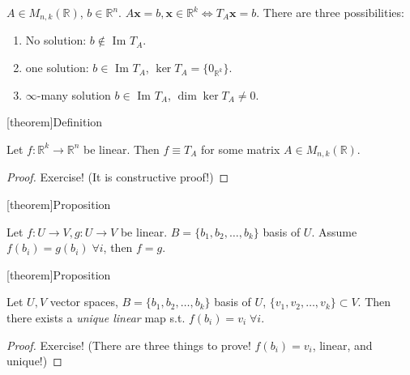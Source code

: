 \documentclass[12pt]{report}
\theoremstyle{definition}
\begin{document}
\begin{ex}
    $A \in M_{n,k}(\mathbb{R})$, $b \in \mathbb{R}^{n}$.
    $A\mathbf{x} = b, \mathbf{x} \in \mathbb{R}^{k} \iff T_A \mathbf{x} = b$.
    There are three possibilities:
    \begin{enumerate}[label = (\arabic*)]
        \item No solution: $b \notin $ Im $T_A$.
        \item one solution: $b \in$ Im $T_A$, $\ker{T_A} = \{0_{\mathbb{R}^{k}}\}$.
        \item $\infty$-many solution $b \in$ Im $T_A$, $\dim{\ker{T_A}} \neq 0$.
    \end{enumerate}
\end{ex}

[theorem]{Definition}
\begin{linear map has a matrix representation}
    Let $f:\mathbb{R}^{k} \rightarrow{} \mathbb{R}^{n}$ be linear.
    Then $f \equiv T_A$ for some matrix $A \in M_{n,k}(\mathbb{R})$.
\end{linear map has a matrix representation}

\begin{proof}
   Exercise! (It is constructive proof!)
\end{proof}

[theorem]{Proposition}
\begin{same basis tranformed implies same linear map}
    Let $f:U\rightarrow{}V, g:U\rightarrow{}V$ be linear.
    $B = \{b_1, b_2,\ldots,b_k\}$ basis of $U$.
    Assume $f(b_i) = g(b_i) \;\forall i$, then $f = g$.
\end{same basis tranformed implies same linear map}

[theorem]{Proposition}
\begin{unique linear map from U to V}
    Let $U,V$ vector spaces, $B = \{b_1, b_2,\ldots,b_k\}$ basis of $U$,
    $\{v_1, v_2,\ldots,v_k\} \subset V$.
    Then there exists a \emph{unique linear} map s.t. $f(b_i) = v_i \;\forall i$.
\end{unique linear map from U to V}

\begin{proof}
    Exercise! (There are three things to prove! $f(b_i) = v_i$, linear, and unique!)
\end{proof}
\end{document}
